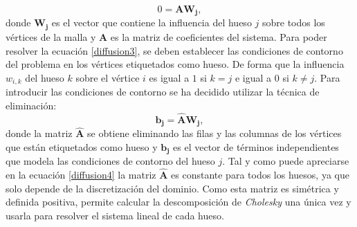 \begin{equation}
\label{diffusion3}
 0 =  \mathbf{A} \mathbf{W_j},
\end{equation}
donde $\mathbf{W_j}$ es el vector que contiene la influencia del hueso $j$ sobre todos los vértices de la malla y $\mathbf{A}$ es la matriz de coeficientes del sistema. 
Para poder resolver la ecuación \ref{diffusion3}, se deben establecer las condiciones de contorno del problema en los vértices etiquetados como hueso. De forma que la influencia $w_{i,k}$ del hueso $k$ sobre el vértice $i$ es igual a $1$ si $k=j$ e igual a 0 si
$k \neq j$. Para introducir las condiciones de contorno se ha decidido utilizar la técnica de eliminación: 
\begin{equation}
\label{diffusion4}
 \mathbf{b_j} =  \mathbf{\hat{A}} \mathbf{W_j},
\end{equation}
donde la matriz $\mathbf{\hat{A}}$ se obtiene eliminando las filas y las columnas de los vértices que están etiquetados como hueso y  $\mathbf{b_j}$ es el vector de términos independientes que modela las condiciones de contorno del hueso $j$. Tal y como puede apreciarse en la ecuación \ref{diffusion4} la matriz $\mathbf{\hat{A}}$ es constante para todos los huesos, ya que solo depende de la discretización del dominio. Como esta matriz es simétrica y definida positiva, permite calcular la descomposición de \emph{Cholesky} una única vez y usarla para resolver el sistema lineal de cada hueso.






%



